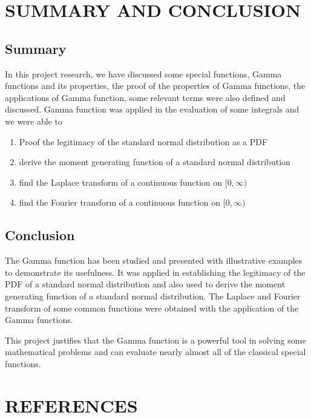 \documentclass[11pt]{report}
\renewcommand{\labelenumi}{\roman{enumi}.}
\begin{document}
	
	\chapter{SUMMARY AND CONCLUSION}
	\section{Summary}
	In this project research, we have discussed some special functions, Gamma functions and its properties, the proof of the properties of Gamma functions, the applications of Gamma function, some relevant terms were also defined and discussed. Gamma function was applied in the evaluation of some integrals and we were able to
	\begin{enumerate}
		\renewcommand{\labelenumi}{\roman{enumi})}
		\item Proof the legitimacy of the standard normal distribution as a PDF
		
		\item derive the moment generating function of a standard normal distribution
		
		\item find the Laplace transform of a continuous function on $[0,\infty)$
		
		\item find the Fourier transform of a continuous function on $[0,\infty)$
	\end{enumerate}
	
	\section{Conclusion}
	The Gamma function has been studied and presented with illustrative examples to demonstrate its usefulness. It was applied in establishing the legitimacy of the PDF of a standard normal distribution and also used to derive the moment generating function of a standard normal distribution. The Laplace and Fourier transform of some common functions were obtained with the application of the Gamma functions.
	
	This project justifies that the Gamma function is a powerful tool in solving some mathematical problems and can evaluate nearly almost all of the classical special functions. 
	

	
	\chapter*{REFERENCES}
	
\end{document}
